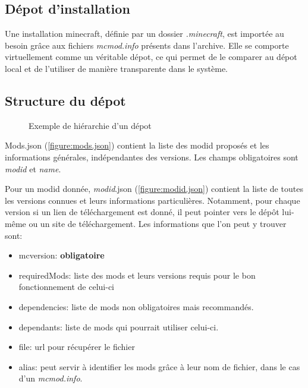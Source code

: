 \documentclass{article}
\begin{document}
\subsection{Dépot d'installation}
\label{subsection:depot_installation}
Une installation minecraft, définie par un dossier \textit{.minecraft}, est importée au besoin grâce aux fichiers \textit{mcmod.info} présents dans l'archive.
Elle se comporte virtuellement comme un véritable dépot, ce qui permet de le comparer au dépot local et de l'utiliser de manière transparente dans le système.

\subsection{Structure du dépot}
\begin{figure}
\caption{Exemple de hiérarchie d'un dépot}
\label{fig:hierarchie}
\end{figure}

Mods.json (\ref{figure:mods.json}) contient la liste des modid proposés et les informations générales, indépendantes des versions.
Les champs obligatoires sont \textit{modid} et \textit{name}.

Pour un modid donnée, \textit{modid}.json (\ref{figure:modid.json}) contient la liste de toutes les versions connues et leurs informations particulières.
Notamment, pour chaque version si un lien de téléchargement est donné, il peut pointer vers le dépôt lui-même ou un site de téléchargement.
Les informations que l'on peut y trouver sont:
\begin{itemize}
    \item mcversion: \textbf{obligatoire}
    \item requiredMods: liste des mods et leurs versions requis pour le bon fonctionnement de celui-ci
    \item dependencies: liste de mods non obligatoires mais recommandés.
    \item dependants: liste de mods qui pourrait utiliser celui-ci.
    \item file: url pour récupérer le fichier
    \item alias: peut servir à identifier les mods grâce à leur nom de fichier, dans le cas d'un \textit{mcmod.info}.
\end{itemize}
\end{document}
